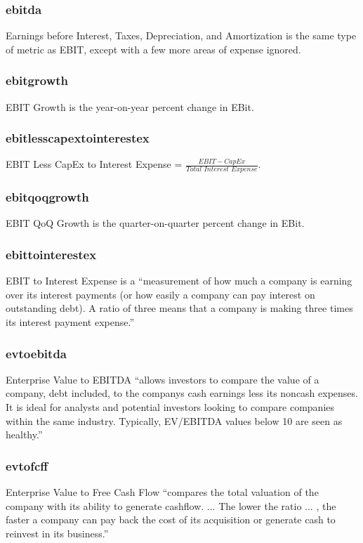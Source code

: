 \subsubsection{ebitda}
Earnings before Interest, Taxes, Depreciation, and Amortization is the same type of metric as EBIT, except with a few more areas of expense ignored.

\subsubsection{ebitgrowth}
EBIT Growth is the year-on-year percent change in EBit.

\subsubsection{ebitlesscapextointerestex}
EBIT Less CapEx to Interest Expense = $\frac{EBIT - CapEx}{Total \,\, Interest \,\, Expense}$.\cite{intrinioDataTags}

\subsubsection{ebitqoqgrowth}
EBIT QoQ Growth is the quarter-on-quarter percent change in EBit.

\subsubsection{ebittointerestex}
EBIT to Interest Expense is a ``measurement of how much a company is earning over its interest payments (or how easily a company can pay interest on outstanding debt). A ratio of three means that a company is making three times its interest payment expense.''\cite{intrinioDataTags}

\subsubsection{evtoebitda} \label{evtoebitda}
Enterprise Value to EBITDA ``allows investors to compare the value of a company, debt included, to the companys cash earnings less its noncash expenses. It is ideal for analysts and potential investors looking to compare companies within the same industry. Typically, EV/EBITDA values below 10 are seen as healthy.''\cite{intrinioDataTags}

\subsubsection{evtofcff}
Enterprise Value to Free Cash Flow ``compares the total valuation of the company with its ability to generate cashflow. ... The lower the ratio ... , the faster a company can pay back the cost of its acquisition or generate cash to reinvest in its business.''\cite{evtofcf}

